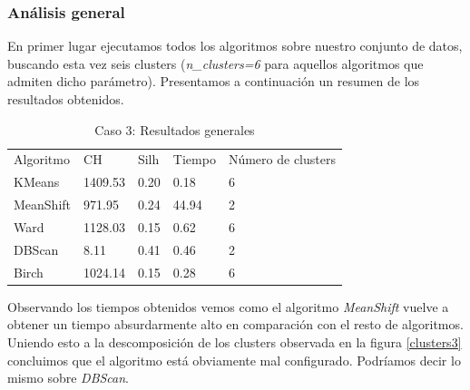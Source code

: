\documentclass[11pt,a4paper]{article}
\begin{document}
	\subsubsection{Análisis general}
	
	En primer lugar ejecutamos todos los algoritmos sobre nuestro conjunto de datos, buscando esta vez seis clusters (\emph{n\_clusters=6} para aquellos algoritmos que admiten dicho parámetro). Presentamos a continuación un resumen de los resultados obtenidos. \\
	
	\begin{table}[H]
		\centering
		\caption{Caso 3: Resultados generales}
		\label{resultados3}
		\begin{tabular}{lllll}
			Algoritmo & CH      & Silh & Tiempo & Número de clusters \\
			KMeans    & 1409.53 & 0.20 & 0.18   & 6                   \\
			MeanShift & 971.95  & 0.24 & 44.94  & 2                   \\
			Ward      & 1128.03 & 0.15 & 0.62   & 6                   \\
			DBScan    & 8.11    & 0.41 & 0.46   & 2                   \\
			Birch     & 1024.14 & 0.15 & 0.28   & 6                  
		\end{tabular}
	\end{table}
	
	Observando los tiempos obtenidos vemos como el algoritmo \emph{MeanShift} vuelve a obtener un tiempo absurdarmente alto en comparación con el resto de algoritmos. Uniendo esto a la descomposición de los clusters observada en la figura \ref{clusters3} concluimos que el algoritmo está obviamente mal configurado. Podríamos decir lo mismo sobre \emph{DBScan}. \\
\end{document}
